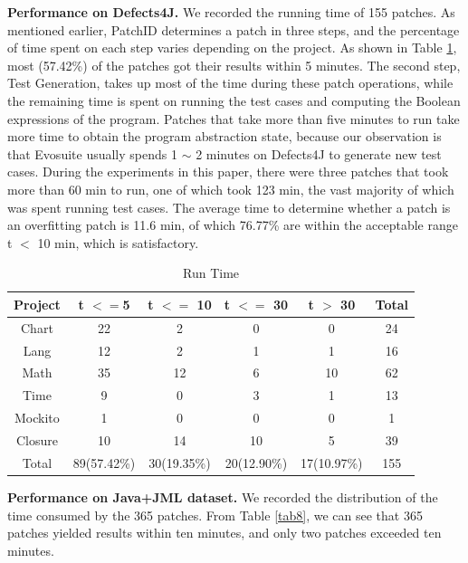 \textbf{Performance on Defects4J.} We recorded the running time of 155 patches. As mentioned earlier, PatchID determines a patch in three steps, and the percentage of time spent on each step varies depending on the project. As shown in Table \ref{tab7}, most (57.42\%) of the patches got their results within 5 minutes. The second step, Test Generation, takes up most of the time during these patch operations, while the remaining time is spent on running the test cases and computing the Boolean expressions of the program. Patches that take more than five minutes to run take more time to obtain the program abstraction state, because our observation is that Evosuite usually spends 1 $\sim$ 2 minutes on Defects4J to generate new test cases. During the experiments in this paper, there were three patches that took more than 60 min to run, one of which took 123 min, the vast majority of which was spent running test cases. The average time to determine whether a patch is an overfitting patch is 11.6 min, of which 76.77\% are within the acceptable range t $<$ 10 min, which is satisfactory.

\begin{table}[ht]
	\begin{minipage}{175px}
		\caption{Run Time}\label{tab7}%
		\begin{tabular}{cccccc}
			
			\toprule
			Project	&t $<= $5	&t $<=$ 10	&t $<=$ 30	&t $>$ 30	&Total\\
			
			
			\midrule
			Chart	&22	&2&	0&	0&	24\\
			Lang&	12&	2&	1&	1&	16\\
			Math&	35&	12&	6&	10&	62\\
			Time&	9&	0&	3&	1&	13\\
			Mockito	&1&	0&	0&	0&	1\\
			Closure&	10&	14&	10&	5&	39\\
			Total&	89(57.42\%)& 	30(19.35\%)	&20(12.90\%)&	17(10.97\%)&	155\\
			
			\bottomrule
		\end{tabular}
	\end{minipage}
\end{table}

\textbf{Performance on Java+JML dataset.} We recorded the distribution of the time consumed by the 365 patches. From Table \ref{tab8}, we can see that 365 patches yielded results within ten minutes, and only two patches exceeded ten minutes.

